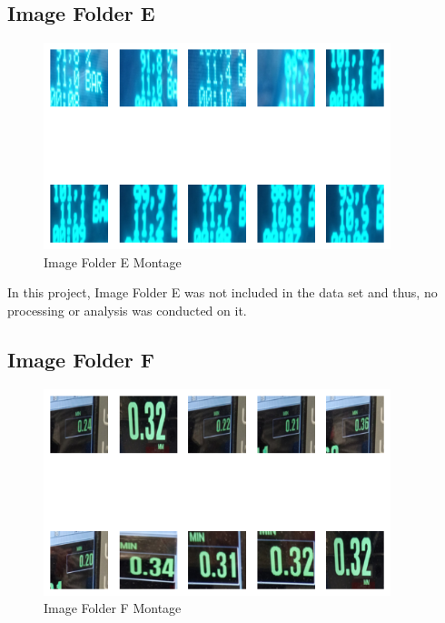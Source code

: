 \newpage

\subsection{Image Folder E}

\begin{figure}[ht]
    \centering
    \includegraphics[width=0.9\textwidth]{Figures/EDA_Charts/6/montage.png}
    \caption[Image Folder E Montage]{Image Folder E Montage}
    \label{fig:Image Folder E Montage}
\end{figure}

In this project, Image Folder E was not included in the data set and thus, no processing or analysis was conducted on it.


\newpage

\subsection{Image Folder F}

\begin{figure}[ht]
    \centering
    \includegraphics[width=0.9\textwidth]{Figures/EDA_Charts/7/montage.png}
    \caption[Image Folder F Montage]{Image Folder F Montage}
    \label{fig:Image Folder F Montage}
\end{figure}

